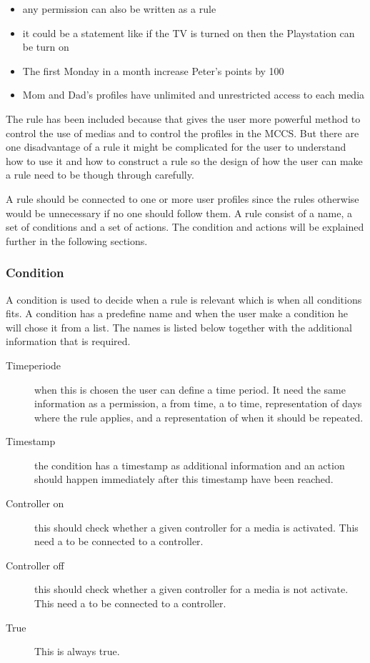 \begin{itemize}
	\item any permission can also be written as a rule
	\item it could be a statement like if the TV is turned on then the Playstation can be turn on
	\item The first Monday in a month increase Peter's points by 100
	\item Mom and Dad's profiles have unlimited and unrestricted access to each media
\end{itemize}

The rule has been included because that gives the user more powerful method to control the use of medias and to control the profiles in the MCCS.
But there are one disadvantage of a rule it might be complicated for the user to understand how to use it and how to construct a rule so the design of how the user can make a rule need to be though through carefully.

A rule should be connected to one or more user profiles since the rules otherwise would be unnecessary if no one should follow them. A rule consist of a name, a set of conditions and a set of actions. The condition and actions will be explained further in the following sections.
	
\subsubsection{Condition}
A condition is used to decide when a rule is relevant which is when all conditions fits. A condition has a predefine name and when the user make a condition he will chose it from a list. The names is listed below together with the additional information that is required. 

\begin{description}
	\item[Timeperiode] when this is chosen the user can define a time period. It need the same information as a permission, a from time, a to time, representation of days where the rule applies, and a representation of when it should be repeated.
	\item[Timestamp] the condition has a timestamp as additional information and an action should happen immediately after this timestamp have been reached. 
	\item[Controller on] this should check whether a given controller for a media is activated. This need a to be connected to a controller.
	\item[Controller off] this should check whether a given controller for a media is not activate. This need a to be connected to a controller.
	\item[True] This is always true.
\end{description}

